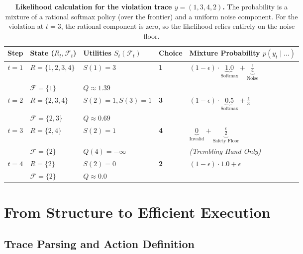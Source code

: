 \documentclass{article}
\theoremstyle{plain}
\theoremstyle{definition}
\theoremstyle{remark}
\begin{document}
\begin{table}[h]
\centering
\caption{\textbf{Likelihood calculation for the violation trace $y=(1, 3, 4, 2)$.} 
The probability is a mixture of a rational softmax policy (over the frontier) and a uniform noise component.
For the violation at $t=3$, the rational component is zero, so the likelihood relies entirely on the noise floor.}
\label{tab:likelihood_calc}
\small
\begin{tabular}{@{}c l l l l@{}}
\toprule
\textbf{Step} & \textbf{State} ($R_t, \mathcal{F}_t$) & \textbf{Utilities} $S_t(\mathcal{F}_t)$ & \textbf{Choice} & \textbf{Mixture Probability} $p(y_t \mid \dots)$ \\
\midrule
$t=1$ & $R=\{1,2,3,4\}$ & $S(1)=3$ & \textbf{1} & $(1-\epsilon) \cdot \underbrace{1.0}_{\text{Softmax}} + \underbrace{\frac{\epsilon}{4}}_{\text{Noise}}$ \\ 
      & $\mathcal{F}=\{1\}$ & $Q \approx 1.39$ & & \\
\addlinespace[6pt]

$t=2$ & $R=\{2,3,4\}$ & $S(2)=1, S(3)=1$ & \textbf{3} & $(1-\epsilon) \cdot \underbrace{0.5}_{\text{Softmax}} + \frac{\epsilon}{3}$ \\
      & $\mathcal{F}=\{2,3\}$ & $Q \approx 0.69$ & & \\
\addlinespace[6pt]

$t=3$ & $R=\{2,4\}$ & $S(2)=1$ & \textbf{4} & $\underbrace{0}_{\text{Invalid}} + \underbrace{\frac{\epsilon}{2}}_{\text{Safety Floor}}$ \\
      & $\mathcal{F}=\{2\}$ & $Q(4)=-\infty$ & & \textit{(Trembling Hand Only)} \\
\addlinespace[6pt]

$t=4$ & $R=\{2\}$ & $S(2)=0$ & \textbf{2} & $(1-\epsilon) \cdot 1.0 + \epsilon$ \\
      & $\mathcal{F}=\{2\}$ & $Q \approx 0.0$ & & \\
\bottomrule
\end{tabular}
\end{table}


\section{From Structure to Efficient Execution}
\label{app:execution}

\subsection{Trace Parsing and Action Definition}
\label{app:action_definition}
\end{document}
